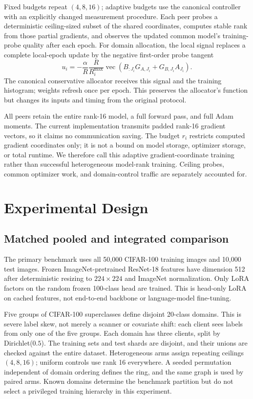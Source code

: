 \documentclass[11pt]{article}
\begin{document}
Fixed budgets repeat $(4,8,16)$; adaptive budgets use the canonical controller with an explicitly changed measurement procedure. Each peer probes a deterministic ceiling-sized subset of the shared coordinates, computes stable rank from those partial gradients, and observes the updated common model's training-probe quality after each epoch. For domain allocation, the local signal replaces a complete local-epoch update by the negative first-order probe tangent
\begin{equation}
 u_i=-\frac{\alpha}{R}\frac{R}{R_i^{\max}}
 \operatorname{vec}\!\left(B_{:J_i}G_{A,J_i}+
 G_{B,J_i}A_{J_i}\right).
 \label{eq:masked-domain-signal}
\end{equation}
The canonical conservative allocator receives this signal and the training histogram; weights refresh once per epoch. This preserves the allocator's function but changes its inputs and timing from the original protocol.

All peers retain the entire rank-16 model, a full forward pass, and full Adam moments. The current implementation transmits padded rank-16 gradient vectors, so it claims no communication saving. The budget $r_i$ restricts computed gradient coordinates only; it is not a bound on model storage, optimizer storage, or total runtime. We therefore call this adaptive gradient-coordinate training rather than successful heterogeneous model-rank training. Ceiling probes, common optimizer work, and domain-control traffic are separately accounted for.

\section{Experimental Design}
\subsection{Matched pooled and integrated comparison}
The primary benchmark uses all 50,000 CIFAR-100 training images and 10,000 test images. Frozen ImageNet-pretrained ResNet-18 features have dimension 512 after deterministic resizing to $224\times224$ and ImageNet normalization. Only LoRA factors on the random frozen 100-class head are trained. This is head-only LoRA on cached features, not end-to-end backbone or language-model fine-tuning.

Five groups of CIFAR-100 superclasses define disjoint 20-class domains. This is severe label skew, not merely a scanner or covariate shift: each client sees labels from only one of the five groups. Each domain has three clients, split by Dirichlet($0.5$). The training sets and test shards are disjoint, and their unions are checked against the entire dataset. Heterogeneous arms assign repeating ceilings $(4,8,16)$; uniform controls use rank 16 everywhere. A seeded permutation independent of domain ordering defines the ring, and the same graph is used by paired arms. Known domains determine the benchmark partition but do not select a privileged training hierarchy in this experiment.
\end{document}
